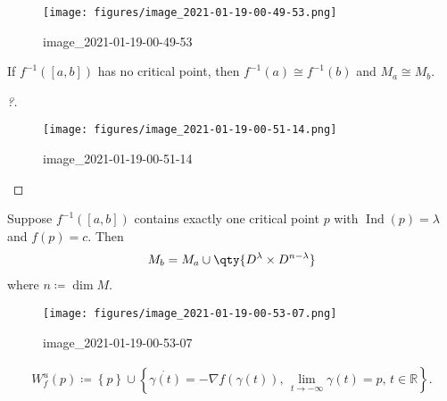 \begin{example}[Torus]

\begin{figure}
\centering
\texttt{[image: figures/image\_2021-01-19-00-49-53.png]}
\caption{image\_2021-01-19-00-49-53}
\end{figure}

\end{example}

\begin{lemma}[?]

If \(f ^{-1} ([a, b])\) has no critical point, then
\(f ^{-1} (a) \cong f ^{-1} (b)\) and \(M_a \cong M_b\).

\end{lemma}

\begin{proof}[?]

\begin{figure}
\centering
\texttt{[image: figures/image\_2021-01-19-00-51-14.png]}
\caption{image\_2021-01-19-00-51-14}
\end{figure}

\end{proof}

\begin{theorem}[?]

Suppose \(f ^{-1} ([a, b])\) contains exactly one critical point \(p\)
with \(\mathop{\mathrm{Ind}}(p) = \lambda\) and \(f(p) = c\). Then
\begin{align*}
M_b = M_a \cup\qty{ D^ \lambda \times D^{n - \lambda} }
\end{align*}
where \(n \coloneqq\dim M\).

\end{theorem}

\begin{example}[?]

\begin{figure}
\centering
\texttt{[image: figures/image\_2021-01-19-00-53-07.png]}
\caption{image\_2021-01-19-00-53-07}
\end{figure}

\end{example}

\begin{definition}

\begin{align*}
W_f^u(p) \coloneqq\left\{{p}\right\} \cup\left\{{
\dot{\gamma(t)} = -\nabla f(\gamma(t)),\, \lim_{t\to -\infty} \gamma(t) = p,\, t\in {\mathbb{R}}
}\right\}
.\end{align*}

\end{definition}

